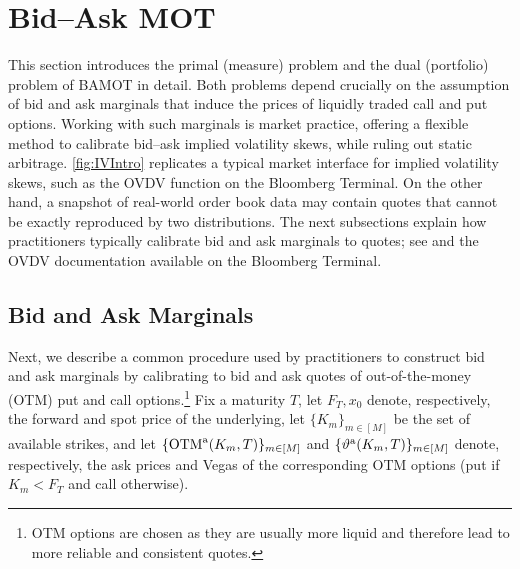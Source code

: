 \documentclass[11pt]{article}
\theoremstyle{plain}
\theoremstyle{definition}
\theoremstyle{remark}
\theoremstyle{plain}
\begin{document}
\section{Bid--Ask MOT}\label{sec:BAMOT}

This section introduces the primal (measure) problem and the dual (portfolio) problem of BAMOT in detail. Both problems depend crucially on the assumption of bid and ask marginals that induce the prices of liquidly traded call and put options. Working with such marginals is market practice, offering  a flexible method to calibrate bid--ask implied volatility skews, while  ruling out  static arbitrage. \cref{fig:IVIntro} replicates a typical market interface for implied volatility skews, such as the OVDV function on the Bloomberg Terminal. %
%
On the other hand, a snapshot of real-world order book data may contain quotes that cannot be exactly reproduced by two distributions. The next subsections explain how practitioners typically calibrate bid and ask marginals to quotes; see \cite{brigoMercurio} and the OVDV documentation available on the Bloomberg Terminal. 
%
%


\subsection{Bid and Ask Marginals}\label{sec:bid-ask-marginals}

Next, we describe a common procedure used by practitioners to construct bid and ask marginals by calibrating to bid and ask quotes of out-of-the-money (OTM) put and call options.\footnote{OTM options are chosen as they are usually more liquid and therefore lead to more reliable and consistent quotes.} Fix a maturity $T$, let $F_T, x_0$ denote, respectively, the forward and spot price of the underlying, let $\{K_m\}_{m\in[M]}$ be the set of available strikes, and let $\{\text{OTM}^{\rm a}(K_m,T)\}_{m\in[M]}$ and $\{\vartheta^{\rm a}(K_m,T)\}_{m\in[M]}$ denote, respectively, the ask prices and Vegas of the corresponding OTM options (put if $K_m< F_T$ and call otherwise). %
\end{document}
